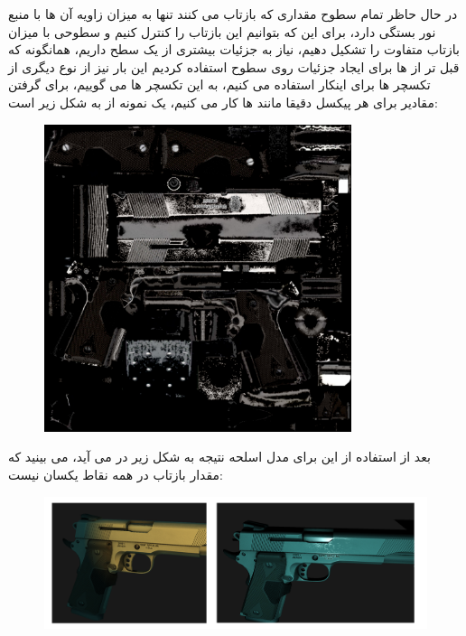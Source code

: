 \documentclass[a4paper, 12pt]{report}
\begin{document}
    در حال حاظر تمام سطوح مقداری که بازتاب می کنند تنها به میزان زاویه آن ها با منبع نور بستگی دارد، برای این که بتوانیم این بازتاب را کنترل کنیم و سطوحی با میزان بازتاب متفاوت را تشکیل دهیم، نیاز به جزئیات بیشتری از یک سطح داریم، همانگونه که قبل تر از  ها برای ایجاد جزئیات روی سطوح استفاده کردیم این بار نیز از نوع دیگری از تکسچر ها برای اینکار استفاده می کنیم، به این تکسچر ها  می گوییم، برای گرفتن مقادیر برای هر پیکسل دقیقا مانند  ها کار می کنیم، یک نمونه از  به شکل زیر است:\par
\begin{figure}[H]
    \centering
    \href{https://github.com/devprofile98/shm}{
        \includegraphics[width=9cm]{images/handgun-S.jpg}
    }
    \caption{\fontsize{11pt}{1.0cm}\zarbold\textbf{}}
    \label{fig:my_label}
\end{figure}
      بعد از استفاده از این  برای مدل اسلحه نتیجه به شکل زیر در می آید، می بینید که مقدار بازتاب در همه نقاط یکسان نیست:

\begin{figure}[H]
    \centering
    \href{https://github.com/devprofile98/shm}{
        \includegraphics[width=15cm]{images/specular-gun.png}
    }
    \caption{\fontsize{11pt}{1.0cm}\zarbold\textbf{}}
    \label{fig:my_label}
\end{figure}
\end{document}
